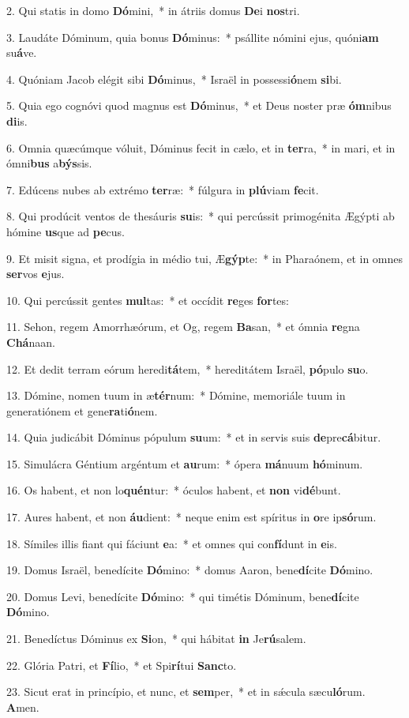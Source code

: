 2. Qui statis in domo \textbf{Dó}mini,~*  in átriis domus \textbf{De}i \textbf{nos}tri.\

3. Laudáte Dóminum, quia bonus \textbf{Dó}minus:~*  psállite nómini ejus, quóni\textbf{am} su\textbf{á}ve.\

4. Quóniam Jacob elégit sibi \textbf{Dó}minus,~*  Israël in possessi\textbf{ó}nem \textbf{si}bi.\

5. Quia ego cognóvi quod magnus est \textbf{Dó}minus,~*  et Deus noster præ \textbf{óm}nibus \textbf{di}is.\

6. Omnia quæcúmque vóluit, Dóminus fecit in cælo, et in \textbf{ter}ra,~*  in mari, et in ómni\textbf{bus} a\textbf{býs}sis.\

7. Edúcens nubes ab extrémo \textbf{ter}ræ:~*  fúlgura in \textbf{plú}viam \textbf{fe}cit.\

8. Qui prodúcit ventos de thesáuris \textbf{su}is:~*  qui percússit primogénita Ægýpti ab hómine \textbf{us}que ad \textbf{pe}cus.\

9. Et misit signa, et prodígia in médio tui, Æ\textbf{gýp}te:~*  in Pharaónem, et in omnes \textbf{ser}vos \textbf{e}jus.\

10. Qui percússit gentes \textbf{mul}tas:~*  et occídit \textbf{re}ges \textbf{for}tes:\

11. Sehon, regem Amorrhæórum, et Og, regem \textbf{Ba}san,~*  et ómnia \textbf{re}gna \textbf{Chá}naan.\

12. Et dedit terram eórum heredi\textbf{tá}tem,~*  hereditátem Israël, \textbf{pó}pulo \textbf{su}o.\

13. Dómine, nomen tuum in æ\textbf{tér}num:~*  Dómine, memoriále tuum in generatiónem et gene\textbf{ra}ti\textbf{ó}nem.\

14. Quia judicábit Dóminus pópulum \textbf{su}um:~*  et in servis suis \textbf{de}pre\textbf{cá}bitur.\

15. Simulácra Géntium argéntum et \textbf{au}rum:~*  ópera \textbf{má}nuum \textbf{hó}minum.\

16. Os habent, et non lo\textbf{quén}tur:~*  óculos habent, et \textbf{non} vi\textbf{dé}bunt.\

17. Aures habent, et non \textbf{áu}dient:~*  neque enim est spíritus in \textbf{o}re ip\textbf{só}rum.\

18. Símiles illis fiant qui fáciunt \textbf{e}a:~*  et omnes qui con\textbf{fí}dunt in \textbf{e}is.\

19. Domus Israël, benedícite \textbf{Dó}mino:~*  domus Aaron, bene\textbf{dí}cite \textbf{Dó}mino.\

20. Domus Levi, benedícite \textbf{Dó}mino:~*  qui timétis Dóminum, bene\textbf{dí}cite \textbf{Dó}mino.\

21. Benedíctus Dóminus ex \textbf{Si}on,~*  qui hábitat \textbf{in} Je\textbf{rú}salem.\

22. Glória Patri, et \textbf{Fí}lio,~*  et Spi\textbf{rí}tui \textbf{Sanc}to.\

23. Sicut erat in princípio, et nunc, et \textbf{sem}per,~*  et in sǽcula sæcu\textbf{ló}rum. \textbf{A}men.\

